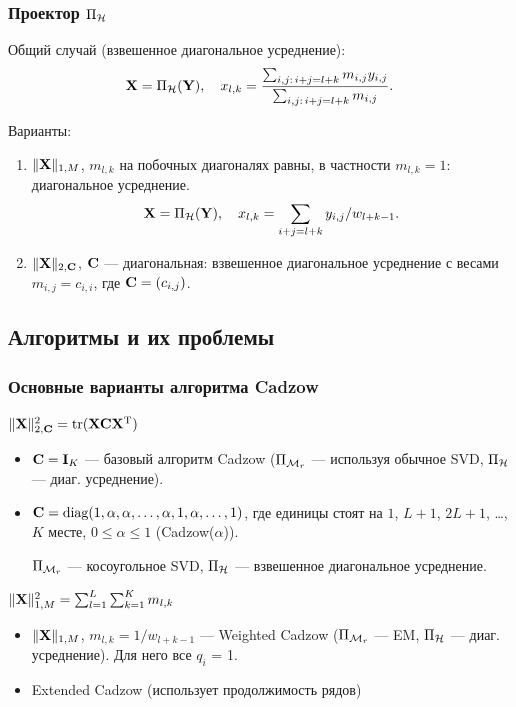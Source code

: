 \documentclass[unicode, notheorems]{beamer}
\begin{document}
\begin{frame}
	\frametitle{Проектор $\Pi_{\mathcal{H}}$}
	Общий случай (взвешенное диагональное усреднение):
	\begin{equation*}
		\mathbf{X} = \Pi_{\mathcal{H}}(\mathbf{Y}), \quad x_{l,k} = \frac{\sum_{i,j:\, i+j=l+k} m_{i, j} y_{i,j}}{\sum_{i,j:\, i+j=l+k} m_{i,j}}.
	\end{equation*}
		
	Варианты:
	\begin{enumerate}
		\item $\|\mathbf{X}\|_{1, M}$, $m_{l,k}$ на побочных диагоналях равны, в частности $m_{l, k} = 1$: диагональное усреднение.
		\begin{equation*}
		\mathbf{X} = \Pi_{\mathcal{H}}(\mathbf{Y}), \quad x_{l,k} = \sum_{i + j = l + k} y_{i, j} / w_{l + k - 1}.
		\end{equation*}
		\item $\|\mathbf{X}\|_{2, \mathbf{C}}$, $\mathbf{C}$ --- диагональная: взвешенное диагональное усреднение с весами $m_{i,j} = c_{i, i}$, где $\mathbf{C} = (c_{i, j})$.
		
	\end{enumerate}
\end{frame}

\subsection{Алгоритмы и их проблемы}
\begin{frame}
	\frametitle{Основные варианты алгоритма Cadzow} 
	$\|\mathbf{X}\|_{2, \mathbf{C}}^2 = \text{tr}(\mathbf{X} \mathbf{C} \mathbf{X}^{\mathrm{T}})$
	\begin{itemize}
		\item $\mathbf{C} = \mathbf{I}_K$ --- базовый алгоритм Cadzow \cite{Cadzow1988} ($\Pi_{\mathcal{M}_r}$ --- используя обычное SVD, $\Pi_{\mathcal{H}}$ --- диаг. усреднение).
		\item $\mathbf{C} = \text{diag}(1, \alpha, \alpha, \ldots, \alpha, 1, \alpha, \ldots, 1)$,
		где единицы стоят на $1$, $L + 1$, $2L + 1$, \ldots , $K$ месте, $0 \le \alpha \le 1$ (Cadzow($\alpha$)).
		
		$\Pi_{\mathcal{M}_r}$ --- косоугольное SVD, $\Pi_{\mathcal{H}}$ --- взвешенное диагональное усреднение.
	\end{itemize}
	
	\vspace{0.3cm}
	$\|\mathbf{X}\|^2_{1, M} =  \sum_{l = 1}^L \sum_{k = 1}^K m_{l, k}$
	\begin{itemize}
		\item $\|\mathbf{X}\|_{1, M}$, $m_{l, k} = 1 / w_{l + k - 1}$ --- Weighted Cadzow ($\Pi_{\mathcal{M}_r}$ --- EM, $\Pi_{\mathcal{H}}$ --- диаг. усреднение). Для него все $q_i$ = 1.
		\item Extended Cadzow (использует продолжимость рядов)
	\end{itemize}
	
	
	
\end{frame}
\end{document}
